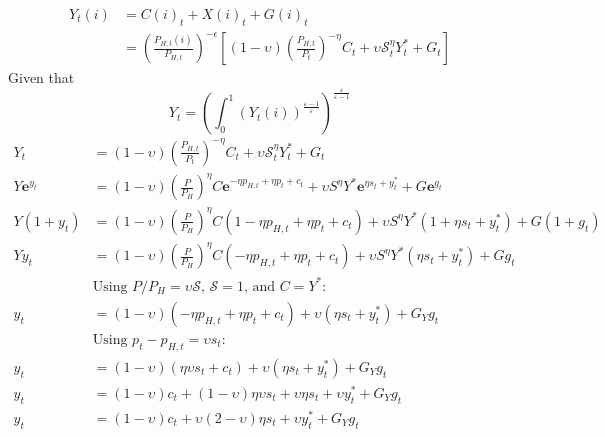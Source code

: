 \begin{align}
    Y_{t}(i) &= C(i)_t + X(i)_{t} + G(i)_t \\
&=\left(\frac{P_{H,t}(i)}{P_{H,t}}\right)^{-\epsilon}\left[ (1-\upsilon)\left(\frac{P_{H,t}}{P_t}\right)^{-\eta}C_t + \upsilon \mathcal{S}_t^{\eta}Y_t^* + G_t\right]
\end{align}
Given that
\begin{equation}
    Y_t = \left( \int_{0}^{1} (Y_t(i))^{\frac{\varepsilon-1}{\varepsilon}}\right)^{\frac{\varepsilon}{\varepsilon-1}}
\end{equation}
\begin{align}
    Y_t &= (1-\upsilon)\left(\frac{P_{H,t}}{P_t}\right)^{-\eta}C_t + \upsilon \mathcal{S}_t^{\eta}Y_t^* + G_t\\
    Y \mathbf{e}^{y_t} &= (1-\upsilon)\left(\frac{P}{P_{H}}\right)^{\eta}C \mathbf{e}^{-\eta p_{H,t} + \eta p_t + c_t}+ \upsilon S^{\eta} Y^* \mathbf{e}^{\eta s_t + y^*_t} + G \mathbf{e}^{g_t}\\
    Y ({1+y_t}) &= (1-\upsilon)\left(\frac{P}{P_{H}}\right)^{\eta}C ({1 -\eta p_{H,t} + \eta p_t + c_t})+ \upsilon S^{\eta} Y^* ({1 + \eta s_t + y^*_t}) + G ({1+ g_t})\\
    Y y_t &= (1-\upsilon)\left(\frac{P}{P_{H}}\right)^{\eta}C ({-\eta p_{H,t} + \eta p_t + c_t})+ \upsilon S^{\eta} Y^* ({\eta s_t + y^*_t}) + G g_t\\
    &\text{Using $P/P_H = \mathcal{\upsilon S}$, $\mathcal{S} = 1$, and $C=Y^*$}:\\
    y_t &= (1-\upsilon)({-\eta p_{H,t} + \eta p_t + c_t})+ \upsilon ({\eta s_t + y^*_t}) + G_Y g_t\\
    &\text{Using $p_t - p_{H,t} = \upsilon s_t$}:\\
    y_t &= (1-\upsilon)({\eta \upsilon s_t + c_t})+ \upsilon ({\eta s_t + y^*_t}) + G_Y g_t\\
    y_t &= (1-\upsilon)c_t + (1-\upsilon) \eta \upsilon s_t + \upsilon {\eta s_t} + \upsilon y^*_t + G_Y g_t\\
    y_t &= (1-\upsilon)c_t + \upsilon (2-\upsilon)\eta s_t + \upsilon y^*_t + G_Y g_t\\
\end{align}
\pagebreak
